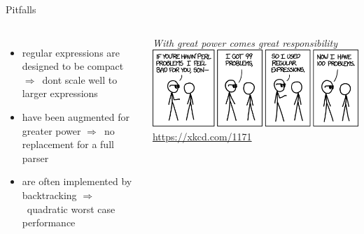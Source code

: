 \documentclass[10pt, graphics, aspectratio=169, table]{beamer}
\newcommand{\ra}{$\Rightarrow$\ }
\begin{document}
    \begin{frame}{Pitfalls}
        \begin{columns}
                \begin{itemize}
                    \item regular expressions are designed to be compact \ra dont scale well to larger expressions
                    \item have been augmented for greater power \ra no replacement for a full parser
                    \item are often implemented by backtracking \ra quadratic worst case performance
                \end{itemize}
                \emph{With great power comes great responsibility}
                \includegraphics[width=\textwidth]{img/xkcd_problem.png}
                \center\tiny\url{https://xkcd.com/1171}
        \end{columns}
    \end{frame}
\end{document}
